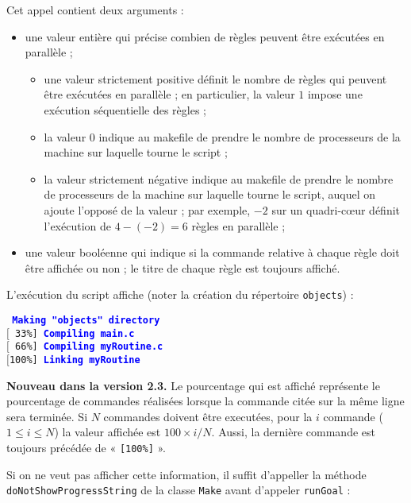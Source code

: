 \documentclass[a4paper,11pt]{extarticle}
\begin{document}
Cet appel contient deux arguments :
\begin{itemize}
\item une valeur entière qui précise combien de règles peuvent être exécutées en parallèle ;
  \begin{itemize}
  \item une valeur strictement positive définit le nombre de règles qui peuvent être exécutées en parallèle ; en particulier, la valeur $1$ impose une exécution séquentielle des règles ;
  \item la valeur $0$ indique au makefile de prendre le nombre de processeurs de la machine sur laquelle tourne le script ;
  \item la valeur strictement négative indique au makefile de prendre le nombre de processeurs de la machine sur laquelle tourne le script, auquel on ajoute l'opposé de la valeur ; par exemple, $-2$ sur un quadri-cœur définit l'exécution de $4-(-2)=6$ règles en parallèle ;
  \end{itemize}
\item une valeur booléenne qui indique si la commande relative à chaque règle doit être affichée ou non ; le titre de chaque règle est toujours affiché.
\end{itemize}

L'exécution du script affiche  (noter la création du répertoire \texttt{objects}) :

\begin{mdframed}[hidealllines=true,backgroundcolor=lightgray!20]
\tt\footnotesize
\textcolor{blue}{\bf Making "objects" directory}\\
$[$~33\%]~\textcolor{blue}{\bf Compiling main.c}\\
$[$~66\%]~\textcolor{blue}{\bf Compiling myRoutine.c}\\
$[$100\%]~\textcolor{blue}{\bf Linking myRoutine}
\end{mdframed}

{\bf Nouveau dans la version 2.3.}\label{affichagePourcentage} Le pourcentage qui est affiché représente le pourcentage de commandes réalisées lorsque la commande citée sur la même ligne sera terminée. Si $N$ commandes doivent être executées, pour la $i$  commande ($1 \leqslant i \leqslant N$) la valeur affichée est $100 \times i / N$. Aussi, la dernière commande est toujours précédée de « \texttt{[100\%]} ».

Si on ne veut pas afficher cette information, il suffit d'appeller la méthode \texttt{doNotShowProgressString} de la classe \texttt{Make} avant d'appeler \texttt{runGoal} :
\end{document}
